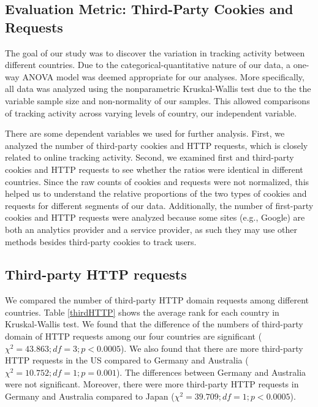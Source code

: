 \documentclass[conference]{IEEEtran}
\begin{document}
\subsection{Evaluation Metric: Third-Party Cookies and Requests}
The goal of our study was to discover the variation in tracking activity between different countries. Due to the categorical-quantitative nature of our data, a one-way ANOVA model was deemed appropriate for our analyses. More specifically, all data was analyzed using the nonparametric Kruskal-Wallis test due to the the variable sample size and non-normality of our samples. This allowed comparisons of tracking activity across varying levels of country, our independent variable.

There are some dependent variables we used for further analysis. First, we analyzed the number of third-party cookies and HTTP requests, which is closely related to online tracking activity. Second, we examined first and third-party cookies and HTTP requests to see whether the ratios were identical in different countries. Since the raw counts of cookies and requests were not normalized, this helped us to understand the relative proportions of the two types of cookies and requests for different segments of our data. Additionally, the number of first-party cookies and HTTP requests were analyzed because some sites (e.g., Google) are both an analytics provider and a service provider, as such they may use other methods besides third-party cookies to track users. 

\subsection{Third-party HTTP requests}
We compared the number of third-party HTTP domain requests among different countries. 
Table \ref{thirdHTTP} shows the average rank for each country in Kruskal-Wallis test. We found that the difference of the numbers of third-party domain of HTTP requests among our four countries are significant ($\chi^{2} = 43.863; df = 3; p < 0.0005$). We also found that there are more third-party HTTP requests in the US compared to Germany and Australia ($\chi^{2} =10.752; df=1; p=0.001$). The differences between Germany and Australia were not significant. Moreover, there were more third-party HTTP requests in Germany and Australia compared to Japan ($\chi^{2} =39.709; df=1; p<0.0005$).
\end{document}
